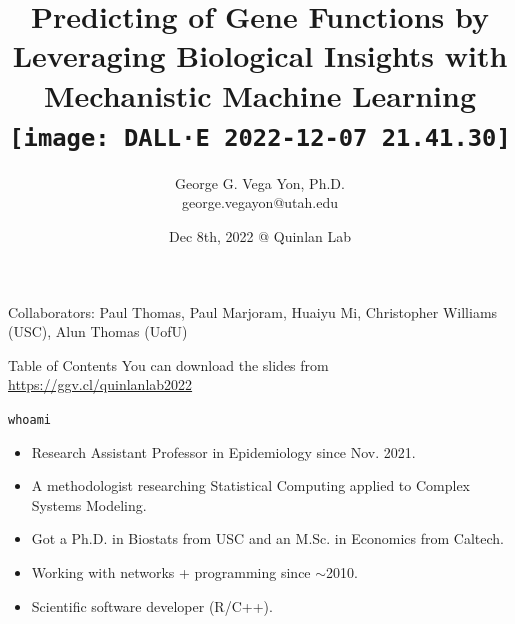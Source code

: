 \documentclass[10pt,aspectratio=169]{beamer}
\title[Predicting Gene Functions with Mech. ML]{Predicting of Gene Functions by Leveraging Biological Insights with Mechanistic Machine Learning\\\texttt{[image: DALL·E 2022-12-07 21.41.30]}\vspace{-.5cm}}
\author[\hyperlink{https://ggv.cl}{https://ggv.cl}]{George G. Vega Yon, Ph.D.\\{\small \color{darkgray}george.vegayon@utah.edu}\vspace{-.5cm}}
\institute[UofUEpi]{Division of Epidemiology @ University of Utah}
\date{Dec 8th, 2022 @ Quinlan Lab\vspace{-.5cm}}
\newcounter{frame}[frame]
\begin{document}
\begin{frame}
    \maketitle
    {\scriptsize Collaborators: Paul Thomas, Paul Marjoram, Huaiyu Mi, Christopher Williams (USC), Alun Thomas (UofU)}
\end{frame}

\begin{frame}{Table of Contents}
    \tableofcontents
    You can download the slides from \url{https://ggv.cl/quinlanlab2022}
\end{frame}

\begin{frame}{\texttt{whoami}}


\begin{itemize}[<+->]
    \item Research Assistant Professor in Epidemiology since Nov. 2021.
    \item A methodologist researching Statistical Computing applied to Complex Systems Modeling.
    \item Got a Ph.D. in Biostats from USC and an M.Sc. in Economics from Caltech.
    \item Working with networks + programming since $\sim$2010.
    \item Scientific software developer (R/C++).
\end{itemize}
    
\end{frame}
\end{document}
